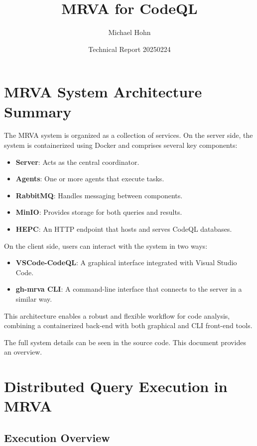 \documentclass[11pt]{article}
\title{MRVA for CodeQL}
\author{Michael Hohn}
\date{Technical Report 20250224}
\begin{document}
\maketitle
\tableofcontents

\section{MRVA System Architecture Summary}

The MRVA system is organized as a collection of services. On the server side, the
system is containerized using Docker and comprises several key components:
\begin{itemize}
    \item {\textbf{Server}}: Acts as the central coordinator.
    \item \textbf{Agents}: One or more agents that execute tasks.
    \item \textbf{RabbitMQ}: Handles messaging between components.
    \item \textbf{MinIO}: Provides storage for both queries and results.
    \item \textbf{HEPC}: An HTTP endpoint that hosts and serves CodeQL databases.
\end{itemize}

On the client side, users can interact with the system in two ways:
\begin{itemize}
    \item {\textbf{VSCode-CodeQL}}: A graphical interface integrated with Visual Studio Code.
    \item \textbf{gh-mrva CLI}: A command-line interface that connects to the server in a similar way.
\end{itemize}

This architecture enables a robust and flexible workflow for code analysis, combining a containerized back-end with both graphical and CLI front-end tools.

The full system details can be seen in the source code.  This document provides an
overview.

\section{Distributed Query Execution in MRVA}

\subsection{Execution Overview}
\end{document}
